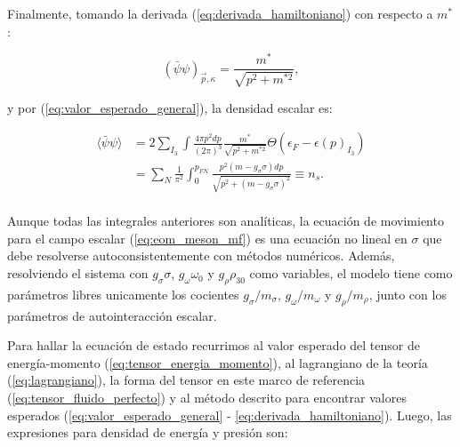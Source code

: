 Finalmente, tomando la derivada (\ref{eq:derivada_hamiltoniano}) con respecto a $m^*$:

\begin{equation*}
	(\bar{\psi} \psi)_{\Vec{p},\kappa} = \frac{m^*}{\sqrt{p^2 + m^{*2}}},
\end{equation*}

y por (\ref{eq:valor_esperado_general}), la densidad escalar es:

\begin{equation}
	\begin{aligned}
		\langle \bar{\psi} \psi \rangle &= 2\sum_{I_3}\int \frac{4 \pi p^2 dp}{(2\pi)^3} \frac{m^*}{\sqrt{p^2 + m^{*2}}} \Theta(\epsilon_F - \epsilon(p)_{I_3}) \\
										&= \sum_N \frac{1}{\pi^2}\int_0^{p_{FN}} \frac{p^2 (m-g_\sigma\sigma) dp}{\sqrt{p^2 + (m-g_\sigma\sigma)^{2}}} \equiv n_s. \\
		\label{eq:densidad_escalar}
	\end{aligned}
\end{equation}

Aunque todas las integrales anteriores son analíticas, la ecuación de movimiento para el campo escalar (\ref{eq:eom_meson_mf}) es una ecuación no lineal en $\sigma$ que debe resolverse autoconsistentemente con métodos numéricos. Además, resolviendo el sistema con $g_\sigma \sigma$, $g_\omega \omega_0$ y $g_\rho \rho_{30}$ como variables, el modelo tiene como parámetros libres unicamente los cocientes $g_\sigma/m_\sigma$, $g_\omega/m_\omega$ y $g_\rho/m_\rho$, junto con los parámetros de autointeracción escalar.

Para hallar la ecuación de estado recurrimos al valor esperado del tensor de energía-momento (\ref{eq:tensor_energia_momento}), al lagrangiano de la teoría (\ref{eq:lagrangiano}), la forma del tensor en este marco de referencia (\ref{eq:tensor_fluido_perfecto}) y al método descrito para encontrar valores esperados (\ref{eq:valor_esperado_general} - \ref{eq:derivada_hamiltoniano}). Luego, las expresiones para densidad de energía y presión son:

